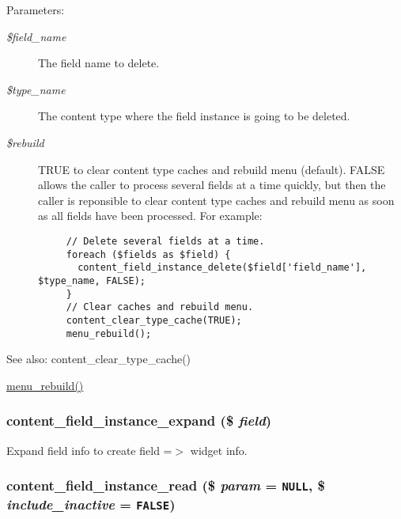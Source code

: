 \begin{Desc}
\item[Parameters:]
\begin{description}
\item[{\em \$field\_\-name}]The field name to delete. \item[{\em \$type\_\-name}]The content type where the field instance is going to be deleted. \item[{\em \$rebuild}]TRUE to clear content type caches and rebuild menu (default). FALSE allows the caller to process several fields at a time quickly, but then the caller is reponsible to clear content type caches and rebuild menu as soon as all fields have been processed. For example: 

\begin{Code}\begin{verbatim}     // Delete several fields at a time.
     foreach ($fields as $field) {
       content_field_instance_delete($field['field_name'], $type_name, FALSE);
     }
     // Clear caches and rebuild menu.
     content_clear_type_cache(TRUE);
     menu_rebuild();
\end{verbatim}
\end{Code}

 \end{description}
\end{Desc}
\begin{Desc}
\item[See also:]content\_\-clear\_\-type\_\-cache() 

\hyperlink{group__menu_gf36dcb9d5491ef5e7d2cf22c1f5c69f4}{menu\_\-rebuild()} \end{Desc}
\hypertarget{content_8crud_8inc_25d078351d19f7aadc913a3b6cb9ebae}{
\subsubsection[{content\_\-field\_\-instance\_\-expand}]{\setlength{\rightskip}{0pt plus 5cm}content\_\-field\_\-instance\_\-expand (\$ {\em field})}}
\label{content_8crud_8inc_25d078351d19f7aadc913a3b6cb9ebae}


Expand field info to create field =$>$ widget info. \hypertarget{content_8crud_8inc_db5f59ebcf235ed60133d755ddb6225a}{
\subsubsection[{content\_\-field\_\-instance\_\-read}]{\setlength{\rightskip}{0pt plus 5cm}content\_\-field\_\-instance\_\-read (\$ {\em param} = {\tt NULL}, \/  \$ {\em include\_\-inactive} = {\tt FALSE})}}
\label{content_8crud_8inc_db5f59ebcf235ed60133d755ddb6225a}


